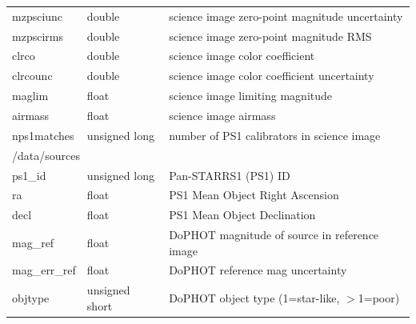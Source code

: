 \documentclass[12pt]{article}
\begin{document}
\begin{enumerate}
\begin{table}[ht!]
\begin{tabular}{ |p{3.5cm}p{2.5cm}p{9cm}| }
     \rowcolor{LightGoldenrodYellow}
     \hspace{1.0cm}mzpsciunc   &   double           &   science image zero-point magnitude uncertainty \\
     \rowcolor{LightGoldenrodYellow}
     \hspace{1.0cm}mzpscirms   &   double           &   science image zero-point magnitude RMS \\
     \rowcolor{LightGoldenrodYellow}
     \hspace{1.0cm}clrco       &   double           &   science image color coefficient \\
     \rowcolor{LightGoldenrodYellow}
     \hspace{1.0cm}clrcounc    &   double           &   science image color coefficient uncertainty \\
     \rowcolor{LightGoldenrodYellow}
     \hspace{1.0cm}maglim      &   float            &   science image limiting magnitude \\
     \rowcolor{LightGoldenrodYellow}
     \hspace{1.0cm}airmass     &   float            &   science image airmass \\
     \rowcolor{LightGoldenrodYellow}
     \hspace{1.0cm}nps1matches &   unsigned long    &   number of PS1 calibrators in science image \\
     \hline
     \multicolumn{3}{|l|}{\hspace{0.5cm}/data/sources} \\
     \hspace{1.0cm}ps1\_id       &   unsigned long   &   Pan-STARRS1 (PS1) ID \\
     \hspace{1.0cm}ra            &   float           &   PS1 Mean Object Right Ascension \\
     \hspace{1.0cm}decl          &   float           &   PS1 Mean Object Declination \\
     \hspace{1.0cm}mag\_ref      &   float           &   DoPHOT magnitude of source in reference image \\
     \hspace{1.0cm}mag\_err\_ref &   float           &   DoPHOT reference mag uncertainty \\
     \hspace{1.0cm}objtype       &   unsigned short  &   DoPHOT object type (1=star-like, $>$1=poor) \\

\end{tabular}
\end{table}
\end{enumerate}
\end{document}
